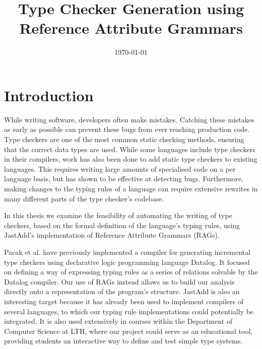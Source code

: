 \documentclass[nofilelist]{cslthse-msc}
\title{Type Checker Generation using Reference Attribute Grammars}
\date{\today}
\newcommand{\CR}[1]{\textcolor{green!60!black}{[\textbf{CR}:#1]}}
\begin{document}
\renewcommand{\bibname}{References}

\makefrontmatter
\chapter{Introduction} %
While writing software, developers often make mistakes.
Catching these mistakes as early as possible can prevent these bugs from ever reaching production code.
Type checkers are one of the most common static checking methods, ensuring that the correct data types are used.
While some languages include type checkers in their compilers, work has also been done to add static type checkers to existing languages.
This requires writing large amounts of specialised code on a per language basis, but has shown to be effective at detecting bugs\cite{10.1145/1985793.1985889}\cite{10.5555/1251375.1251384}\cite{10190394}.
Furthermore, making changes to the typing rules of a language can require extensive rewrites in many different parts of the type checker's codebase.

In this thesis we examine the feasibility of automating the writing of type checkers, based on the formal definition of the language's typing rules, using JastAdd's implementation of Reference Attribute Grammars (RAGs).

Pacak et al. have previously implemented a compiler for generating incremental type checkers using declarative logic programming language Datalog\cite{Pacak}.
It focused on defining a way of expressing typing rules as a series of relations solvable by the Datalog compiler.
Our use of RAGs instead allows us to build our analysis directly onto a representation of the program's structure.
JastAdd is also an interesting target because it has already been used to implement compilers of several languages, to which our typing rule implementations could potentially be integrated.
It is also used extensively in courses within the Department of Computer Science at LTH, where our project could serve as an educational tool, providing students an interactive way to define and test simple type systems.
\end{document}
